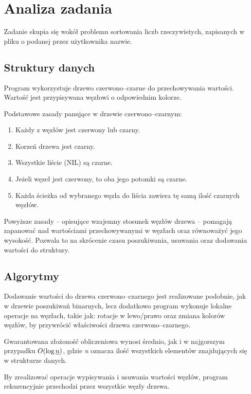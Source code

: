 \section{Analiza zadania}
\begin{justify}	
Zadanie skupia się wokół problemu sortowania liczb rzeczywistych, zapisanych w pliku o podanej przez użytkownika nazwie.
	
\end{justify}

\subsection{Struktury danych}
\begin{justify}
Program wykorzystuje drzewo czerwono–czarne do przechowywania wartości. Wartość jest przypisywana węzłowi o odpowiednim kolorze.

Podstawowe zasady panujące w drzewie czerwono–czarnym: \cite{zasady_drzewa}
\begin{enumerate}
	\item{Każdy z węzłów jest czerwony lub czarny.}
	\item{Korzeń drzewa jest czarny.}
	\item{Wszystkie liście (NIL) są czarne.}
	\item{Jeżeli węzeł jest czerwony, to oba jego potomki są czarne.}
	\item{Każda ścieżka od wybranego węzła do liścia zawiera tę samą ilość czarnych węzłów.}	
\end{enumerate}

Powyższe zasady – opisujące wzajemny stosunek węzłów drzewa – pomagają zapanować nad wartościami przechowywanymi w węzłach oraz równoważyć jego wysokość. Pozwala to na skrócenie czasu poszukiwania, usuwania oraz dodawania wartości do struktury.



\end{justify}

\subsection{Algorytmy}
\begin{justify}

Dodawanie wartości do drzewa czerwono–czarnego jest realizowane podobnie, jak w drzewie poszukiwań binarnych, lecz dodatkowo program wykonuje lokalne operacje na węzłach, takie jak: rotacje w lewo/prawo oraz zmiana kolorów węzłów, by przywrócić właściwości drzewa czerwono–czarnego.

Gwarantowana złożoność obliczeniowa wynosi średnio, jak i w najgorszym przypadku $O(\log{\emph{n})}$, gdzie \emph{n} oznacza ilość wszystkich elementów znajdujących się w strukturze danych.

By zrealizować operacje wypisywania i usuwania wartości węzłów, program rekurencyjnie przechodzi przez wszystkie węzły drzewa.

\end{justify}

